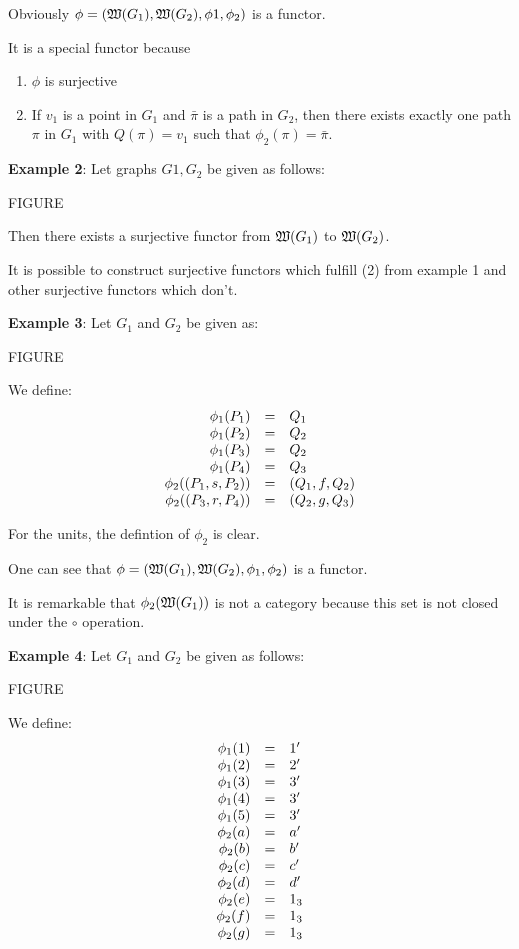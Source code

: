 Obviously $\phi = (\mbox{$\mathfrak{W}(G_1)$}, \mbox{$\mathfrak{W}(G_2)$}, \phi1, \phi_2)$ is a functor.

It is a special functor because
\begin{enumerate}
  \item $\phi$ is surjective
  \item If $v_1$ is a point in $G_1$ and $\bar{\pi}$ is a path in $G_2$, then
  there exists exactly one path $\pi$ in $G_1$ with $Q(\pi) = v_1$ such that
  $\phi_2(\pi) = \bar{\pi}$.
\end{enumerate}

\bigskip

{\bf Example 2}: Let graphs $G1, G_2$ be given as follows:

FIGURE

Then there exists a surjective functor from $\mbox{$\mathfrak{W}(G_1)$}$ to $\mbox{$\mathfrak{W}(G_2)$}$.

It is possible to construct surjective functors which fulfill (2) from example 1
and other surjective functors which don't.

\bigskip

{\bf Example 3}: Let $G_1$ and $G_2$ be given as:

FIGURE

We define: 
\[ \begin{array}{r@{\quad = \quad}l}
\phi_1(P_1) & Q_1 \\
\phi_1(P_2) & Q_2 \\
\phi_1(P_3) & Q_2 \\
\phi_1(P_4) & Q_3 \\
\phi_2((P_1, s, P_2)) & (Q_1, f, Q_2) \\
\phi_2((P_3, r, P_4)) & (Q_2, g, Q_3)
\end{array} \]

For the units, the defintion of $\phi_2$ is clear. 

One can see that $\phi = (\mbox{$\mathfrak{W}(G_1)$}, \mbox{$\mathfrak{W}(G_2)$}, \phi_1, \phi_2)$
is a functor.

It is remarkable that $\phi_2(\mbox{$\mathfrak{W}(G_1)$})$ is not a category because this
set is not closed under the $\circ$ operation.

\bigskip
{\bf Example 4}: Let $G_1$ and $G_2$ be given as follows:

FIGURE

We define:
\[ \begin{array}{r@{\quad = \quad}l}
\phi_1(1) & 1' \\
\phi_1(2) & 2' \\
\phi_1(3) & 3' \\
\phi_1(4) & 3' \\
\phi_1(5) & 3' \\
\phi_2(a) & a' \\
\phi_2(b) & b' \\
\phi_2(c) & c' \\
\phi_2(d) & d' \\
\phi_2(e) & 1_3 \\
\phi_2(f) & 1_3 \\
\phi_2(g) & 1_3
\end{array} \]

